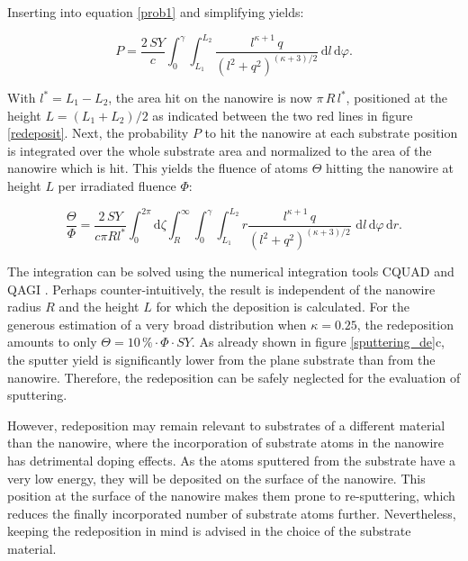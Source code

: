 Inserting into equation \ref{prob1} and simplifying yields:

\begin{equation}
\label{prob2}
P = \frac{2\,SY}{c} \int_0^{\gamma} \! \int_{L_1}^{L_2} \!  \frac{l^{\kappa+1}\,q}{(l^2 + q^2)^{(\kappa + 3)/2}} \,\mathrm{d}l \, \mathrm{d}\varphi.
\end{equation}

With $l^*=L_1-L_2$, the area hit on the nanowire is now $\pi \, R \, l^*$, positioned at the height $L= (L_1+L_2)/2$ as indicated between the two red lines in figure \ref{redeposit}. Next, the probability $P$ to hit the nanowire at each substrate position is integrated over the whole substrate area and normalized to the area of the nanowire which is hit. This yields the fluence of atoms $\Theta$ hitting the nanowire at height $L$ per irradiated fluence $\Phi$:

\begin{equation}
\label{prob3}
\frac{\Theta}{\Phi} = \frac{2\,SY}{c \pi Rl^*} \int_0^{2\pi}\! \mathrm{d}\zeta \int_R^{\infty} \!
\int_0^{\gamma} \! \int_{L_1}^{L_2} \! r \frac{l^{\kappa+1}\,q}{(l^2 + q^2)^{(\kappa + 3)/2}}\,\,\mathrm{d}l \, \mathrm{d}\varphi\,\mathrm{d}r.
\end{equation}

The integration can be solved using the numerical integration tools CQUAD and QAGI \cite{gough_gnu_2009}. Perhaps counter-intuitively, the result is independent of the nanowire radius $R$ and the height $L$ for which the deposition is calculated. For the generous estimation of a very broad distribution when $\kappa = 0.25$, the redeposition amounts to only $\Theta =10\,\% \cdot \Phi\cdot SY$. As already shown in figure \ref{sputtering_de}c, the sputter yield is significantly lower from the plane substrate than from the nanowire. Therefore, the redeposition can be safely neglected for the evaluation of sputtering. 

However, redeposition may remain relevant to substrates of a different material than the nanowire, where the incorporation of substrate atoms in the nanowire has detrimental doping effects. As the atoms sputtered from the substrate have a very low energy, they will be deposited on the surface of the nanowire. This position at the surface of the nanowire makes them prone to re-sputtering, which reduces the finally incorporated number of substrate atoms further. Nevertheless, keeping the redeposition in mind is advised in the choice of the substrate material.


